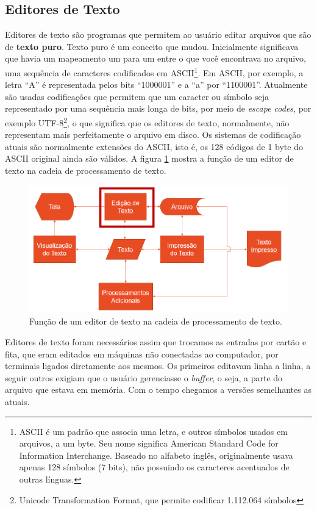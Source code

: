 \subsection{Editores de Texto}

Editores de texto são programas que permitem ao usuário editar arquivos que são de \textbf{texto puro}. Texto puro é um conceito que mudou. Inicialmente significava que havia um mapeamento um para um entre o que você encontrava no arquivo, uma sequência de caracteres codificados em ASCII\footnote{ASCII é um padrão que associa uma letra, e outros símbolos usados em arquivos, a um byte. Seu nome significa American Standard Code for Information Interchange. Baseado no alfabeto inglês, originalmente usava apenas 128 símbolos (7 bits), não possuindo os caracteres acentuados de outras línguas.}. Em ASCII, por exemplo, a letra \enquote{A} é representada pelos bits \enquote{1000001} e a \enquote{a} por \enquote{1100001}. Atualmente são usadas codificações que permitem que um caracter ou símbolo seja representado por uma sequência mais longa de bits, por meio de \textit{escape codes}, por exemplo UTF-8\footnote{Unicode Transformation Format, que permite codificar 1.112.064 símbolos}, o que significa que os editores de texto, normalmente, não representam mais perfeitamente o arquivo em disco. Os sistemas de codificação atuais são normalmente extensões do ASCII, isto é, os 128 códigos de 1 byte do ASCII original ainda são válidos. A figura \ref{fig:funedtexto} mostra a função de um editor de texto na cadeia de processamento de texto.

\begin{figure}[hbt]
    \centering
    \includegraphics[width=0.7\linewidth]{Images/editordetexto}
    \caption[Função de um editor de texto]{Função de um editor de texto na cadeia de processamento de texto.}
    \label{fig:funedtexto}
\end{figure}





Editores de texto foram necessários assim que trocamos as entradas por cartão e fita, que eram editados em máquinas não conectadas ao computador, por terminais ligados diretamente aos mesmos. Os primeiros editavam linha a linha, a seguir outros exigiam que o usuário gerenciasse o \textit{buffer}, o seja, a parte do arquivo que estava em memória. Com o tempo chegamos a versões semelhantes as atuais.

